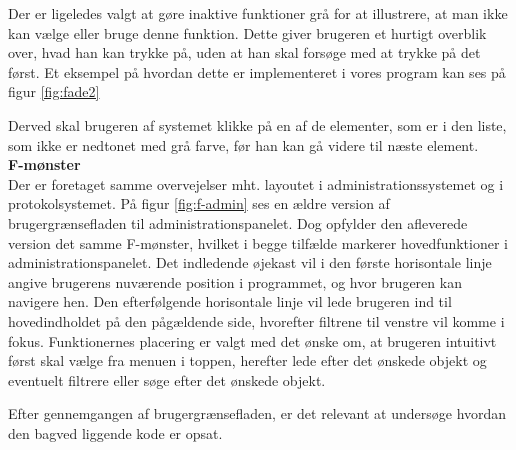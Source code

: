 Der er ligeledes valgt at gøre inaktive funktioner grå for at illustrere, at man ikke kan vælge eller bruge denne funktion. Dette giver brugeren et hurtigt overblik over, hvad han kan trykke på, uden at han skal forsøge med at trykke på det først. Et eksempel på hvordan dette er implementeret i vores program kan ses på figur \ref{fig:fade2}


Derved skal brugeren af systemet klikke på en af de elementer, som er i den liste, som ikke er nedtonet med grå farve, før han kan gå videre til næste element.\\

\textbf{F-mønster}\\
Der er foretaget samme overvejelser mht. layoutet i administrationssystemet og i protokolsystemet. På figur \ref{fig:f-admin} ses en ældre version af brugergrænsefladen til administrationspanelet. Dog opfylder den afleverede version det samme F-mønster, hvilket i begge tilfælde markerer hovedfunktioner i administrationspanelet. Det indledende øjekast vil i den første horisontale linje angive brugerens nuværende position i programmet, og hvor brugeren kan navigere hen. Den efterfølgende horisontale linje vil lede brugeren ind til hovedindholdet på den pågældende side, hvorefter filtrene til venstre vil komme i fokus. Funktionernes placering er valgt med det ønske om, at brugeren intuitivt først skal vælge fra menuen i toppen, herefter lede efter det ønskede objekt og eventuelt filtrere eller søge efter det ønskede objekt.


Efter gennemgangen af brugergrænsefladen, er det relevant at undersøge hvordan den bagved liggende kode er opsat.